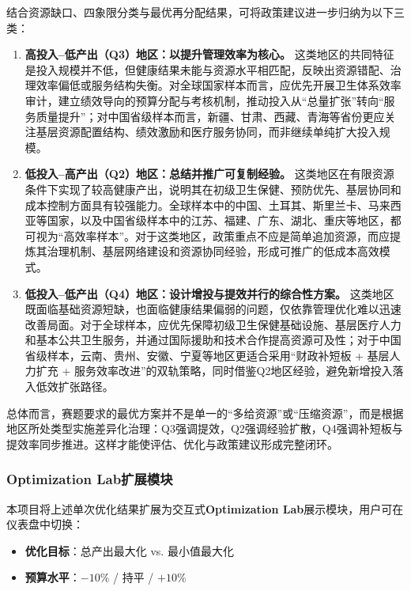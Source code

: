 \documentclass[12pt,a4paper]{ctexart}
\begin{document}
结合资源缺口、四象限分类与最优再分配结果，可将政策建议进一步归纳为以下三类：
\begin{enumerate}[label=\arabic*)]
    \item \textbf{高投入--低产出（Q3）地区：以提升管理效率为核心。} 这类地区的共同特征是投入规模并不低，但健康结果未能与资源水平相匹配，反映出资源错配、治理效率偏低或服务结构失衡。对全球国家样本而言，应优先开展卫生体系效率审计，建立绩效导向的预算分配与考核机制，推动投入从“总量扩张”转向“服务质量提升”；对中国省级样本而言，新疆、甘肃、西藏、青海等省份更应关注基层资源配置结构、绩效激励和医疗服务协同，而非继续单纯扩大投入规模。
    \item \textbf{低投入--高产出（Q2）地区：总结并推广可复制经验。} 这类地区在有限资源条件下实现了较高健康产出，说明其在初级卫生保健、预防优先、基层协同和成本控制方面具有较强能力。全球样本中的中国、土耳其、斯里兰卡、马来西亚等国家，以及中国省级样本中的江苏、福建、广东、湖北、重庆等地区，都可视为“高效率样本”。对于这类地区，政策重点不应是简单追加资源，而应提炼其治理机制、基层网络建设和资源协同经验，形成可推广的低成本高效模式。
    \item \textbf{低投入--低产出（Q4）地区：设计增投与提效并行的综合性方案。} 这类地区既面临基础资源短缺，也面临健康结果偏弱的问题，仅依靠管理优化难以迅速改善局面。对于全球样本，应优先保障初级卫生保健基础设施、基层医疗人力和基本公共卫生服务，并通过国际援助和技术合作提高资源可及性；对于中国省级样本，云南、贵州、安徽、宁夏等地区更适合采用“财政补短板 + 基层人力扩充 + 服务效率改进”的双轨策略，同时借鉴Q2地区经验，避免新增投入落入低效扩张路径。
\end{enumerate}

总体而言，赛题要求的最优方案并不是单一的“多给资源”或“压缩资源”，而是根据地区所处类型实施差异化治理：Q3强调提效，Q2强调经验扩散，Q4强调补短板与提效率同步推进。这样才能使评估、优化与政策建议形成完整闭环。

\subsubsection{Optimization Lab扩展模块}

本项目将上述单次优化结果扩展为交互式\textbf{Optimization Lab}展示模块，用户可在仪表盘中切换：
\begin{itemize}[leftmargin=1.5em]
    \item \textbf{优化目标}：总产出最大化 vs. 最小值最大化
    \item \textbf{预算水平}：$-10\%$ / 持平 / $+10\%$
\end{itemize}
\end{document}
